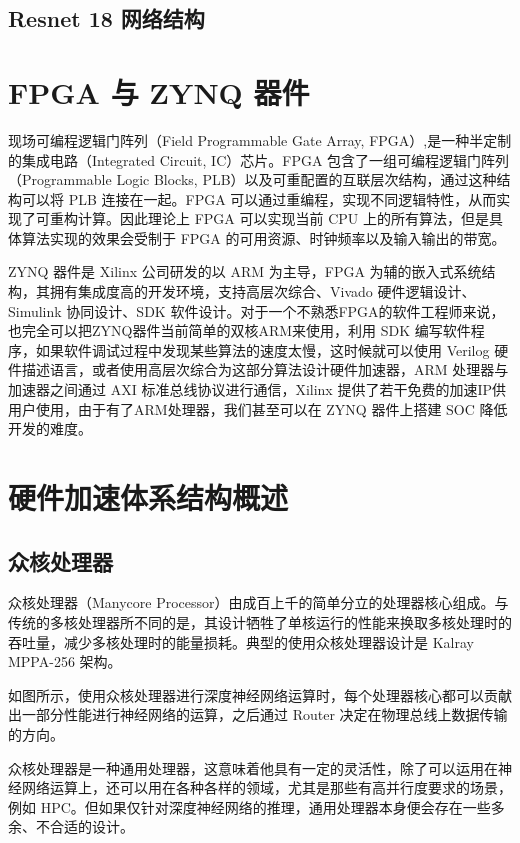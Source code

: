 \subsection{Resnet 18 网络结构}



\section{FPGA 与 ZYNQ 器件}

现场可编程逻辑门阵列（Field Programmable Gate Array, FPGA）,是一种半定制的集成电路（Integrated Circuit, IC）芯片。FPGA 包含了一组可编程逻辑门阵列（Programmable Logic Blocks, PLB）以及可重配置的互联层次结构，通过这种结构可以将 PLB 连接在一起。FPGA 可以通过重编程，实现不同逻辑特性，从而实现了可重构计算。因此理论上 FPGA 可以实现当前 CPU 上的所有算法，但是具体算法实现的效果会受制于 FPGA 的可用资源、时钟频率以及输入输出的带宽。

ZYNQ 器件是 Xilinx 公司研发的以 ARM 为主导，FPGA 为辅的嵌入式系统结构，其拥有集成度高的开发环境，支持高层次综合、Vivado 硬件逻辑设计、Simulink 协同设计、SDK 软件设计。对于一个不熟悉FPGA的软件工程师来说，也完全可以把ZYNQ器件当前简单的双核ARM来使用，利用 SDK 编写软件程序，如果软件调试过程中发现某些算法的速度太慢，这时候就可以使用 Verilog 硬件描述语言，或者使用高层次综合为这部分算法设计硬件加速器，ARM 处理器与加速器之间通过 AXI 标准总线协议进行通信，Xilinx 提供了若干免费的加速IP供用户使用，由于有了ARM处理器，我们甚至可以在 ZYNQ 器件上搭建 SOC 降低开发的难度。

\section{硬件加速体系结构概述}

\subsection{众核处理器}

众核处理器（Manycore Processor）由成百上千的简单分立的处理器核心组成。与传统的多核处理器所不同的是，其设计牺牲了单核运行的性能来换取多核处理时的吞吐量，减少多核处理时的能量损耗。典型的使用众核处理器设计是 Kalray MPPA-256 架构。

如图所示，使用众核处理器进行深度神经网络运算时，每个处理器核心都可以贡献出一部分性能进行神经网络的运算，之后通过 Router 决定在物理总线上数据传输的方向。

众核处理器是一种通用处理器，这意味着他具有一定的灵活性，除了可以运用在神经网络运算上，还可以用在各种各样的领域，尤其是那些有高并行度要求的场景，例如 HPC。但如果仅针对深度神经网络的推理，通用处理器本身便会存在一些多余、不合适的设计。 

